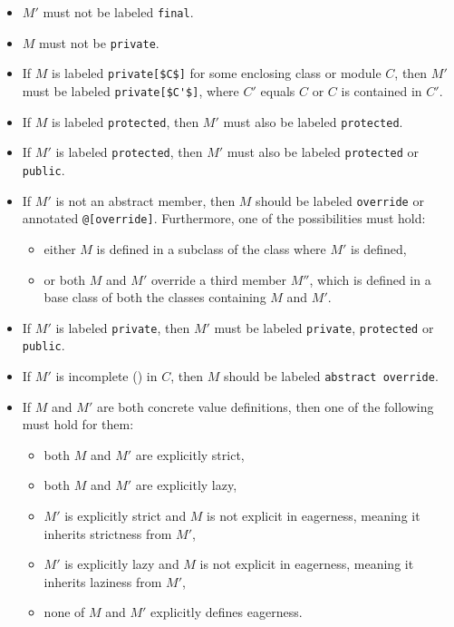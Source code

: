 \begin{itemize}
\item 
$M'$ must not be labeled \lstinline!final!. 

\item 
$M$ must not be \lstinline!private!. 

\item 
If $M$ is labeled \lstinline!private[$C$]! for some enclosing class or module $C$, then $M'$ must be labeled \lstinline!private[$C'$]!, where $C'$ equals $C$ or $C$ is contained in $C'$.

\item 
If $M$ is labeled \lstinline!protected!, then $M'$ must also be labeled \lstinline!protected!. 

\item 
If $M'$ is labeled \lstinline!protected!, then $M'$ must also be labeled \lstinline!protected! or \lstinline!public!. 

\item
If $M'$ is not an abstract member, then $M$ should be labeled \lstinline!override! or annotated \lstinline!@[override]!. Furthermore, one of the possibilities must hold:
\begin{itemize}
\item either $M$ is defined in a subclass of the class where $M'$ is defined,
\item or both $M$ and $M'$ override a third member $M''$, which is defined in a base class of both the classes containing $M$ and $M'$.
\end{itemize}

\item 
If $M'$ is labeled \lstinline!private!, then $M'$ must be labeled \lstinline!private!, \lstinline!protected! or \lstinline!public!. 

\item
If $M'$ is incomplete () in $C$, then $M$ should be labeled \lstinline!abstract override!. 

\item
If $M$ and $M'$ are both concrete value definitions, then one of the following must hold for them:
\begin{itemize} 
\item both $M$ and $M'$ are explicitly strict,
\item both $M$ and $M'$ are explicitly lazy,
\item $M'$ is explicitly strict and $M$ is not explicit in eagerness, meaning it inherits strictness from $M'$,
\item $M'$ is explicitly lazy and $M$ is not explicit in eagerness, meaning it inherits laziness from $M'$,
\item none of $M$ and $M'$ explicitly defines eagerness.
\end{itemize}

\end{itemize}

